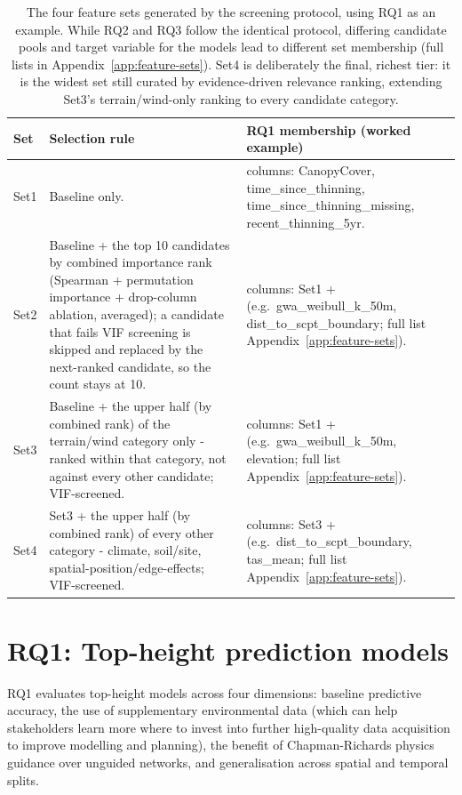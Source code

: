 \documentclass[logo,msc,ai]{infthesis}           %
\begin{document}
\begin{table}[!htbp]
\scriptsize
\begin{tabular}{@{} p{1.3cm} p{6.8cm} >{\raggedright\arraybackslash}p{5.4cm} @{}}\toprule
Set & Selection rule & RQ1 membership (worked example) \\
\midrule
Set1 & Baseline only. & 4 columns: CanopyCover, time\_since\_thinning, time\_since\_thinning\_missing, recent\_thinning\_5yr. \\
Set2 & Baseline + the top 10 candidates by combined importance rank (Spearman + permutation
importance + drop-column ablation, averaged); a candidate that fails VIF screening is skipped and
replaced by the next-ranked candidate, so the count stays at 10. & 14 columns: Set1 + (e.g.\
gwa\_weibull\_k\_50m, dist\_to\_scpt\_boundary; full list Appendix~\ref{app:feature-sets}). \\
Set3 & Baseline + the upper half (by combined rank) of the terrain/wind category only - ranked
within that category, not against every other candidate; VIF-screened. & 15 columns: Set1 + (e.g.\
gwa\_weibull\_k\_50m, elevation; full list Appendix~\ref{app:feature-sets}). \\
Set4 & Set3 + the upper half (by combined rank) of every other category - climate, soil/site,
spatial-position/edge-effects; VIF-screened. & 18 columns: Set3 + (e.g.\ dist\_to\_scpt\_boundary,
tas\_mean; full list Appendix~\ref{app:feature-sets}). \\
\bottomrule
\end{tabular}
\caption{The four feature sets generated by the screening protocol, using RQ1 as an example. While RQ2 and RQ3 follow the identical protocol, differing candidate pools and target variable for the models lead to different set membership (full lists in Appendix~\ref{app:feature-sets}). Set4 is deliberately the final, richest tier: it is the widest set still curated by evidence-driven relevance ranking, extending Set3's terrain/wind-only ranking to every candidate category.}
\label{tab:feature-sets-composition-rq1}
\end{table} %

\section{RQ1: Top-height prediction models}
\label{sec:rq1-models}

RQ1 evaluates top-height models across four dimensions: baseline predictive accuracy, the use of supplementary environmental data (which can help stakeholders learn more where to invest into further high-quality data acquisition to improve modelling and planning), the benefit of Chapman-Richards physics guidance over unguided networks, and generalisation across spatial and temporal splits.
\end{document}
